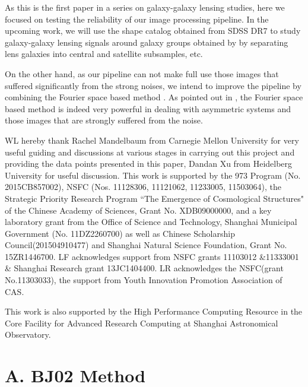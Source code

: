 \documentclass[apj]{emulateapj}
\begin{document}
%

As this is the first paper in a series on galaxy-galaxy lensing
studies, here we focused on testing the reliability of our image
processing pipeline. In the upcoming work, we will use the shape
catalog obtained from SDSS DR7 to study galaxy-galaxy lensing signals
around galaxy groups obtained by \citet{Yang2007, Yang2012} by
separating lens galaxies into central and satellite subsamples, etc.

On the other hand, as our pipeline can not make full use those images
that suffered significantly from the strong noises, we intend to
improve the pipeline by combining the Fourier space based method
\citep{Zhang2015}.  As pointed out in \citet{Zhang2015}, the Fourier
space based method is indeed very powerful in dealing with asymmetric
systems and those images that are strongly suffered from the noise.


\acknowledgements

WL hereby thank Rachel Mandelbaum from Carnegie Mellon University for
very useful guiding and discussions at various stages in carrying out
this project and providing the data points presented in this paper,
Dandan Xu from Heidelberg University for useful discussion.  This work
is supported by the 973 Program (No. 2015CB857002), NSFC
(Nos. 11128306, 11121062, 11233005, 11503064), the Strategic Priority
Research Program ``The Emergence of Cosmological Structures" of the
Chinese Academy of Sciences, Grant No.  XDB09000000, and a key
laboratory grant from the Office of Science and Technology, Shanghai
Municipal Government (No. 11DZ2260700) as well as Chinese Scholarship
Council(201504910477) and Shanghai Natural
Science Foundation, Grant No. 15ZR1446700. LF acknowledges support
from NSFC grants 11103012 \&11333001 \& Shanghai Research grant
13JC1404400. LR acknowledges the NSFC(grant No.11303033), 
the support from Youth Innovation Promotion Association of CAS.

This work is also supported by the High Performance Computing Resource
in the Core Facility for Advanced Research Computing at Shanghai
Astronomical Observatory.




\appendix

\section{A. BJ02 Method}
\label{bj02_detail}
\end{document}
